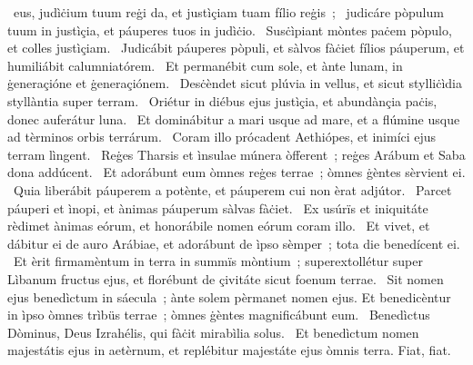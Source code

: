 { }
{%
~eus, judìċium tuum reġi da, et justìçiam tuam fílio reġis~; 
~judicáre pòpulum tuum in justìçia, et páuperes tuos in judìċio. 
~Susċìpiant mòntes paċem pòpulo, et colles justìçiam. 
~Judicábit páuperes pòpuli, et sàlvos fàċiet fílios páuperum, et humiliábit calumniatórem. 
~Et permanébit cum sole, et ànte lunam, in ġeneraçióne et ġeneraçiónem. 
~Desċèndet sicut plúvia in vellus, et sicut stylliċìdia styllàntia super terram. 
~Oriétur in diébus ejus justìçia, et abundànçia paċis, donec auferátur luna. 
~Et dominábitur a mari usque ad mare, et a flúmine usque ad tèrminos orbis terrárum. 
~Coram illo prócadent Aethiópes, et inimíci ejus terram lìngent. 
~Reġes Tharsis et ìnsulae múnera òfferent~; reġes Arábum et Saba dona addúcent. 
~Et adorábunt eum òmnes reġes terrae~; òmnes ġèntes sèrvient ei. 
~Quia liberábit páuperem a potènte, et páuperem cui non èrat adjútor. 
~Parcet páuperi et ìnopi, et ànimas páuperum sàlvas fàċiet. 
~Ex usúrïs et iniquitáte rèdimet ànimas eórum, et honorábile nomen eórum coram illo. 
~Et vivet, et dábitur ei de auro Arábiae, et adorábunt de ìpso sèmper~; tota die benedícent ei. 
~Et èrit firmamèntum in terra in summïs mòntium~; superextollétur super Lìbanum fructus ejus, et florébunt de çivitáte sicut foenum terrae. 
~Sit nomen ejus benedìctum in sáecula~; ànte solem pèrmanet nomen ejus. Et benedicèntur in ìpso òmnes trìbüs terrae~; òmnes ġèntes magnificábunt eum. 
~Benedìctus Dòminus, Deus Izrahélis, qui fàċit mirabìlia solus. 
~Et benedìctum nomen majestátis ejus in aetèrnum, et replébitur majestáte ejus òmnis terra. Fiat, fiat. 
}

